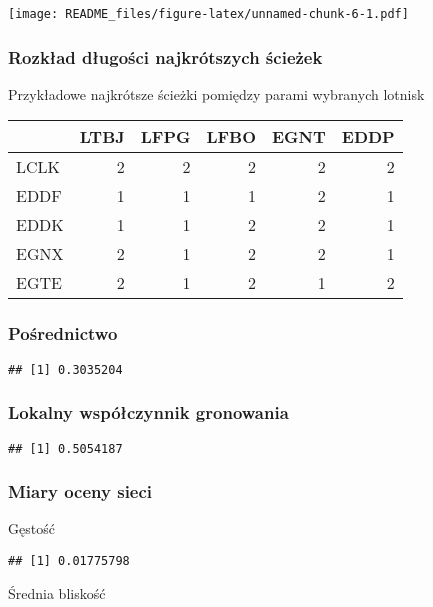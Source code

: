 \documentclass[
]{article}
\begin{document}
\texttt{[image: README\_files/figure-latex/unnamed-chunk-6-1.pdf]}

\hypertarget{rozkux142ad-dux142ugoux15bci-najkruxf3tszych-ux15bcieux17cek}{%
\subsubsection{Rozkład długości najkrótszych
ścieżek}\label{rozkux142ad-dux142ugoux15bci-najkruxf3tszych-ux15bcieux17cek}}

Przykładowe najkrótsze ścieżki pomiędzy parami wybranych lotnisk

\begin{longtable}[]{@{}lrrrrr@{}}
\toprule
& LTBJ & LFPG & LFBO & EGNT & EDDP\tabularnewline
\midrule
\endhead
LCLK & 2 & 2 & 2 & 2 & 2\tabularnewline
EDDF & 1 & 1 & 1 & 2 & 1\tabularnewline
EDDK & 1 & 1 & 2 & 2 & 1\tabularnewline
EGNX & 2 & 1 & 2 & 2 & 1\tabularnewline
EGTE & 2 & 1 & 2 & 1 & 2\tabularnewline
\bottomrule
\end{longtable}

\hypertarget{poux15brednictwo}{%
\subsubsection{Pośrednictwo}\label{poux15brednictwo}}

\begin{verbatim}
## [1] 0.3035204
\end{verbatim}

\hypertarget{lokalny-wspuxf3ux142czynnik-gronowania}{%
\subsubsection{Lokalny współczynnik
gronowania}\label{lokalny-wspuxf3ux142czynnik-gronowania}}

\begin{verbatim}
## [1] 0.5054187
\end{verbatim}

\hypertarget{miary-oceny-sieci}{%
\subsubsection{Miary oceny sieci}\label{miary-oceny-sieci}}

Gęstość

\begin{verbatim}
## [1] 0.01775798
\end{verbatim}

Średnia bliskość
\end{document}
